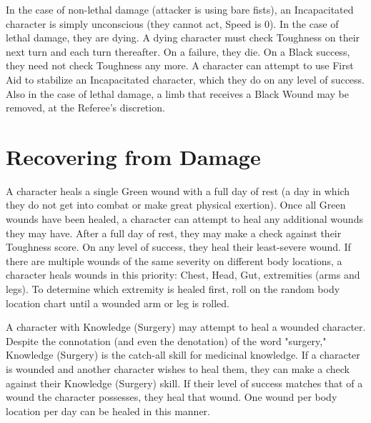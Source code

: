 \documentclass[oneside]{book}
\begin{document}
\begin{multicols}{2}
\begin{center}
\end{center}

In the case of non-lethal damage (attacker is using bare fists), an Incapacitated character is simply unconscious (they cannot act, Speed is 0). In the case of lethal damage, they are dying. A dying character must check Toughness on their next turn and each turn thereafter. On a failure, they die. On a Black success, they need not check Toughness any more. A character can attempt to use First Aid to stabilize an Incapacitated character, which they do on any level of success. Also in the case of lethal damage, a limb that receives a Black Wound may be removed, at the Referee's discretion. 

\section{Recovering from Damage}
A character heals a single Green wound with a full day of rest (a day in which they do not get into combat or make great physical exertion). Once all Green wounds have been healed, a character can attempt to heal any additional wounds they may have. After a full day of rest, they may make a check against their Toughness score. On any level of success, they heal their least-severe wound. If there are multiple wounds of the same severity on different body locations, a character heals wounds in this priority: Chest, Head, Gut, extremities (arms and legs). To determine which extremity is healed first, roll on the random body location chart until a wounded arm or leg is rolled. 

A character with Knowledge (Surgery) may attempt to heal a wounded character. Despite the connotation (and even the denotation) of the word "surgery," Knowledge (Surgery) is the catch-all skill for medicinal knowledge. If a character is wounded and another character wishes to heal them, they can make a check against their Knowledge (Surgery) skill. If their level of success matches that of a wound the character possesses, they heal that wound. One wound per body location per day can be healed in this manner. 


\end{multicols}
\end{document}
